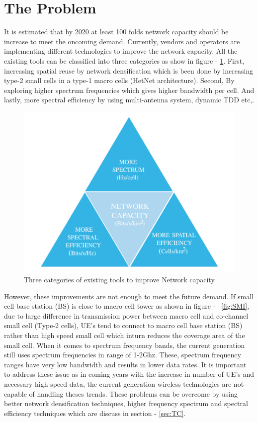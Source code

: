 \documentclass[12pt,onecolumn]{IEEEtran}
\begin{document}
\section{The Problem}
\label{sec:TP}
It is estimated that by 2020 at least 100 folds network capacity should be increase to meet the oncoming demand. Currently, vendors and operators are implementing different technologies to improve the network capacity. All the existing tools can be classified into three categories as show in figure - \ref{fig:NWCP}. First, increasing spatial reuse by network densification  which is been done by increasing type-2 small cells in a type-1 macro cells (HetNet architecture). Second, By exploring higher spectrum frequencies which gives higher bandwidth per cell. And lastly, more spectral efficiency by using multi-antenna system, dynamic TDD etc,. 

\begin{figure}[ht]
\includegraphics[scale=0.3]{nwcp_class}
\centering
\caption{Three categories of existing tools to improve Network capacity.~\cite{main_paper}}
\label{fig:NWCP}
\end{figure}
However, these improvements are not enough to meet the future demand. If small cell base station (BS) is close to macro cell tower as shown in figure - ~\ref{fig:SMI}, due to large difference in transmission power between macro cell and co-channel small cell (Type-2 cells), UE's tend to connect to macro cell base station (BS) rather than high speed small cell which inturn reduces the coverage area of the small cell. When it comes to spectrum frequency bands, the current generation still uses spectrum frequencies in range of 1-2Ghz. These, spectrum frequency ranges have very low bandwidth and results in lower data rates.
It is important to address these issue as in coming years with the increase in number of UE's and necessary high speed data, the current generation wireless technologies are not capable of handling theses trends. These problems can be overcome by using better network densification techniques, higher frequency spectrum and spectral efficiency techniques which are discuss in section - \ref{sec:TC}.
\end{document}
